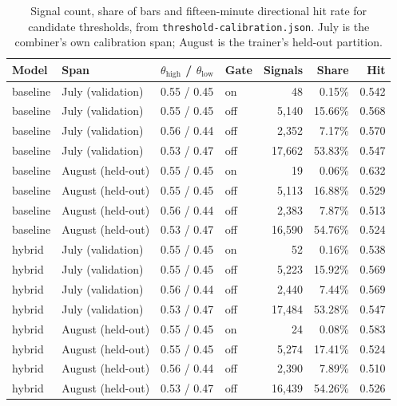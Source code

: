 \begin{table}[htbp]
\centering
\caption[Threshold calibration signal counts and directional hit rates]{Signal count, share of bars and fifteen-minute directional hit rate for candidate thresholds, from \texttt{threshold-calibration.json}. July is the combiner's own calibration span; August is the trainer's held-out partition.}
\label{tab:threshold-calibration}
\small
\begin{tabular}{llllrrr}
\toprule
\textbf{Model} & \textbf{Span} & $\theta_{\text{high}}$ / $\theta_{\text{low}}$ & \textbf{Gate} & \textbf{Signals} & \textbf{Share} & \textbf{Hit} \\
\midrule
baseline & July (validation) & 0.55 / 0.45 & on  & 48     & 0.15\%  & 0.542 \\
baseline & July (validation) & 0.55 / 0.45 & off & 5,140  & 15.66\% & 0.568 \\
baseline & July (validation) & 0.56 / 0.44 & off & 2,352  & 7.17\%  & 0.570 \\
baseline & July (validation) & 0.53 / 0.47 & off & 17,662 & 53.83\% & 0.547 \\
baseline & August (held-out) & 0.55 / 0.45 & on  & 19     & 0.06\%  & 0.632 \\
baseline & August (held-out) & 0.55 / 0.45 & off & 5,113  & 16.88\% & 0.529 \\
baseline & August (held-out) & 0.56 / 0.44 & off & 2,383  & 7.87\%  & 0.513 \\
baseline & August (held-out) & 0.53 / 0.47 & off & 16,590 & 54.76\% & 0.524 \\
\midrule
hybrid   & July (validation) & 0.55 / 0.45 & on  & 52     & 0.16\%  & 0.538 \\
hybrid   & July (validation) & 0.55 / 0.45 & off & 5,223  & 15.92\% & 0.569 \\
hybrid   & July (validation) & 0.56 / 0.44 & off & 2,440  & 7.44\%  & 0.569 \\
hybrid   & July (validation) & 0.53 / 0.47 & off & 17,484 & 53.28\% & 0.547 \\
hybrid   & August (held-out) & 0.55 / 0.45 & on  & 24     & 0.08\%  & 0.583 \\
hybrid   & August (held-out) & 0.55 / 0.45 & off & 5,274  & 17.41\% & 0.524 \\
hybrid   & August (held-out) & 0.56 / 0.44 & off & 2,390  & 7.89\%  & 0.510 \\
hybrid   & August (held-out) & 0.53 / 0.47 & off & 16,439 & 54.26\% & 0.526 \\
\bottomrule
\end{tabular}
\end{table}

